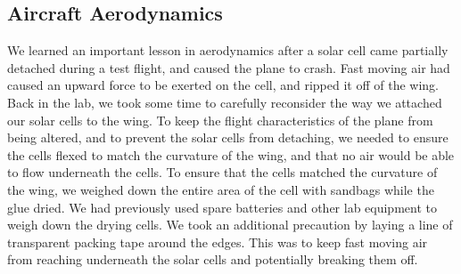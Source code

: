 \documentclass[12pt,journal,compsoc]{IEEEtran}
\begin{document}
\subsection{Aircraft Aerodynamics}
We learned an important lesson in aerodynamics after a solar cell came partially detached during a test flight, and caused the plane to crash. Fast moving air had caused an upward force to be exerted on the cell, and ripped it off of the wing. Back in the lab, we took some time to carefully reconsider the way we attached our solar cells to the wing. To keep the flight characteristics of the plane from being altered, and to prevent the solar cells from detaching, we needed to ensure the cells flexed to match the curvature of the wing, and that no air would be able to flow underneath the cells. To ensure that the cells matched the curvature of the wing, we weighed down the entire area of the cell with sandbags while the glue dried. We had previously used spare batteries and other lab equipment to weigh down the drying cells. We took an additional precaution by laying a line of transparent packing tape around the edges. This was to keep fast moving air from reaching underneath the solar cells and potentially breaking them off.
\end{document}
